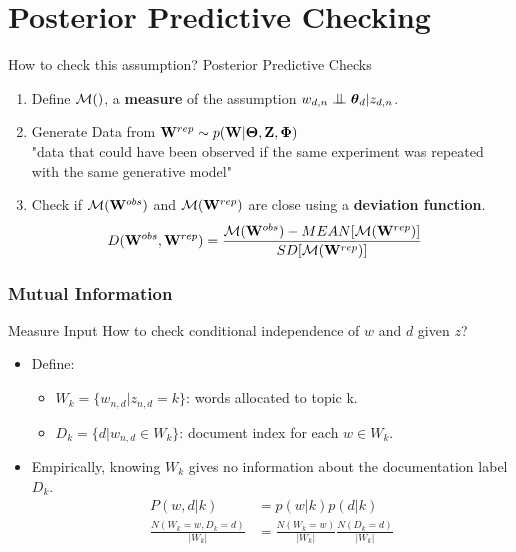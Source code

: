 \documentclass{beamer}
\newcommand{\indep}{\mathrel{\text{\scalebox{1.07}{$\perp\mkern-10mu\perp$}}}}
\begin{document}
\section{Posterior Predictive Checking} 

\begin{frame} {How to check this assumption?}
Posterior Predictive Checks
\begin{enumerate}
\item Define ${\cal M}()$, a \textbf{measure} of the assumption $w_{d, n} \indep \btheta_d | z_{d, n}$.
\item Generate Data from ${\bf W}^{rep} \sim p({\bf W} | \boldsymbol{\Theta}, {\bf Z}, \boldsymbol{\Phi})$\\
{\footnotesize "data that could have been observed if the same experiment was repeated with the same generative model"}
\item Check if ${\cal M}({\bf W}^{obs})$ and ${\cal M}({\bf W}^{rep})$ are close using a \textbf{deviation function}.
\begin{align*}
D({\bf W}^{obs}, {\bf W}^{rep}) &= 
\frac{{\cal M}({\bf W}^{obs}) - MEAN[{\cal M}({\bf W}^{rep})]}{SD[{\cal M}({\bf W}^{rep})]}
\end{align*}
\end{enumerate}
\end{frame}

\subsubsection{Mutual Information} 

\begin{frame}{Measure Input}
How to check conditional independence of $w$ and $d$ given $z$?
\begin{itemize}
\item Define: 
\begin{itemize}
\item $W_k = \{w_{n, d} | z_{n, d} = k \}$: words allocated to topic k.
\item $D_k = \{d | w_{n, d} \in W_k \}$: document index for each $w \in W_k$.
\end{itemize}
\item Empirically, knowing $W_k$ gives no information about the documentation label $D_k$.
\begin{align*}
P(w, d|k) &= p(w|k) p(d|k)
\\
\frac{N(W_k = w, D_k = d)}{|W_k|} &= 
\frac{N(W_k = w)}{|W_k|}
\frac{N(D_k = d)}{|W_k|}
\end{align*}
\end{itemize}
\end{frame}
\end{document}
